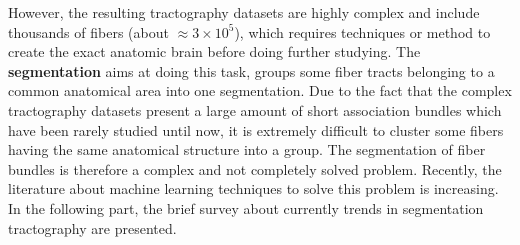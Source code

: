 However, the resulting tractography datasets are highly complex and include thousands of fibers (about $\approx 3 \times 10^5$), which requires techniques or method to create the exact anatomic brain before doing further studying. The \textbf{segmentation} aims at doing this task, groups some fiber tracts belonging to a common anatomical area into one segmentation. Due to the fact that the complex tractography datasets present a large amount of short association bundles which have been rarely studied until now, it is extremely difficult to cluster some fibers having the same anatomical structure into a group. The segmentation of fiber bundles is therefore a complex and not completely solved problem. 
Recently, the literature about machine learning techniques to solve this problem is increasing. 
In the following part, the brief survey about currently trends in segmentation tractography are presented.

